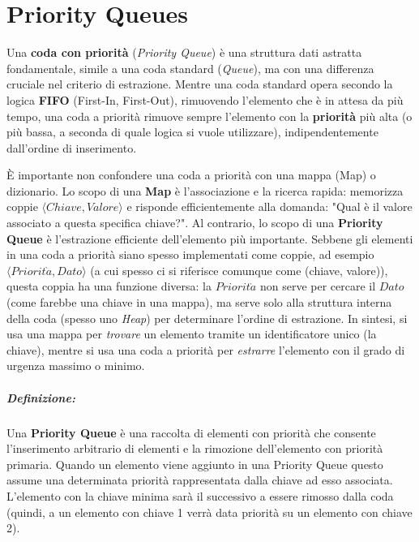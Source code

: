\chapter{Priority Queues}
\label{cap:PriorityQueues}

Una \textbf{coda con priorità} (\emph{Priority Queue}) è una struttura dati astratta fondamentale, simile a una coda standard (\emph{Queue}), ma con una differenza cruciale nel criterio di estrazione. Mentre una coda standard opera secondo la logica \textbf{FIFO} (First-In, First-Out), rimuovendo l'elemento che è in attesa da più tempo, una coda a priorità rimuove sempre l'elemento con la \textbf{priorità} più alta (o più bassa, a seconda di quale logica si vuole utilizzare), indipendentemente dall'ordine di inserimento. 

È importante non confondere una coda a priorità con una mappa (Map) o dizionario. Lo scopo di una \textbf{Map} è l'associazione e la ricerca rapida: memorizza coppie $\langle Chiave, Valore \rangle$ e risponde efficientemente alla domanda: "Qual è il valore associato a questa specifica chiave?". Al contrario, lo scopo di una \textbf{Priority Queue} è l'estrazione efficiente dell'elemento più importante. Sebbene gli elementi in una coda a priorità siano spesso implementati come coppie, ad esempio $\langle Priorit\grave{a}, Dato \rangle$ (a cui spesso ci si riferisce comunque come (chiave, valore)), questa coppia ha una funzione diversa: la $Priorit\grave{a}$ non serve per cercare il $Dato$ (come farebbe una chiave in una mappa), ma serve solo alla struttura interna della coda (spesso uno \textit{Heap}) per determinare l'ordine di estrazione. In sintesi, si usa una mappa per \emph{trovare} un elemento tramite un identificatore unico (la chiave), mentre si usa una coda a priorità per \emph{estrarre} l'elemento con il grado di urgenza massimo o minimo.


\paragraph{Definizione:} Una \textbf{Priority Queue} è una raccolta di elementi con priorità che consente l'inserimento arbitrario di elementi e la rimozione dell'elemento con priorità primaria. Quando un elemento viene aggiunto in una Priority Queue questo assume una determinata priorità rappresentata dalla chiave ad esso associata. L'elemento con la chiave minima sarà il successivo a essere rimosso dalla coda (quindi, a un elemento con chiave 1 verrà data priorità su un elemento con chiave 2).



